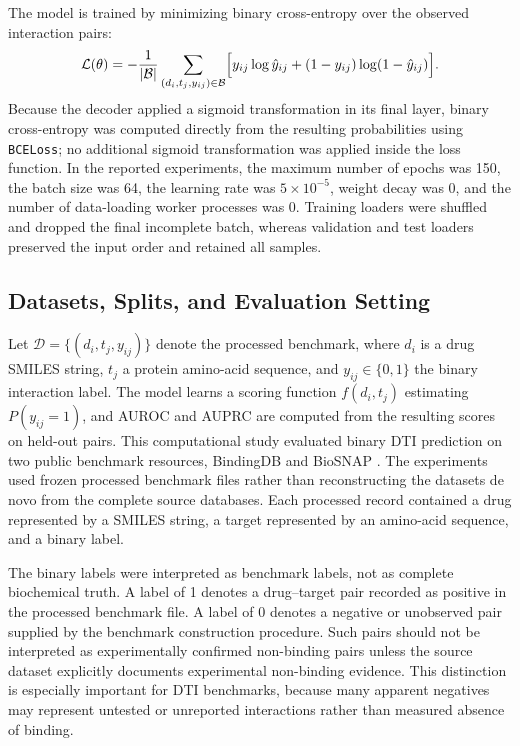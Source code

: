 \documentclass[computers,article,submit,moreauthors]{Definitions/mdpi}
\begin{document}
The model is trained by minimizing binary cross-entropy over the observed interaction pairs:
\begin{equation}
\mathcal{L}(\theta) = - \frac{1}{|\mathcal{B}|} \sum_{(d_i, t_j, y_{ij}) \in \mathcal{B}}
\Bigl[ y_{ij} \log \hat{y}_{ij} + (1 - y_{ij}) \log (1 - \hat{y}_{ij}) \Bigr].
\end{equation}
Because the decoder applied a sigmoid transformation in its final layer, binary cross-entropy was computed directly from the resulting probabilities using \texttt{BCELoss}; no additional sigmoid transformation was applied inside the loss function. In the reported experiments, the maximum number of epochs was 150, the batch size was 64, the learning rate was $5 \times 10^{-5}$, weight decay was 0, and the number of data-loading worker processes was 0. Training loaders were shuffled and dropped the final incomplete batch, whereas validation and test loaders preserved the input order and retained all samples.

\subsection{Datasets, Splits, and Evaluation Setting}
Let $\mathcal{D} = \{(d_i, t_j, y_{ij})\}$ denote the processed benchmark, where $d_i$ is a drug SMILES string, $t_j$ a protein amino-acid sequence, and $y_{ij} \in \{0,1\}$ the binary interaction label. The model learns a scoring function $f(d_i, t_j)$ estimating $P(y_{ij}=1)$, and AUROC and AUPRC are computed from the resulting scores on held-out pairs. This computational study evaluated binary DTI prediction on two public benchmark resources, BindingDB \citep{liu2007bindingdb} and BioSNAP \citep{zitnik2018}. The experiments used frozen processed benchmark files rather than reconstructing the datasets de novo from the complete source databases. Each processed record contained a drug represented by a SMILES string, a target represented by an amino-acid sequence, and a binary label.

The binary labels were interpreted as benchmark labels, not as complete biochemical truth. A label of 1 denotes a drug--target pair recorded as positive in the processed benchmark file. A label of 0 denotes a negative or unobserved pair supplied by the benchmark construction procedure. Such pairs should not be interpreted as experimentally confirmed non-binding pairs unless the source dataset explicitly documents experimental non-binding evidence. This distinction is especially important for DTI benchmarks, because many apparent negatives may represent untested or unreported interactions rather than measured absence of binding.
\end{document}

